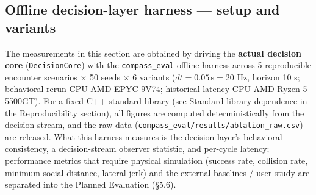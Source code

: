 \documentclass[11pt]{article}
\newcommand{\code}[1]{\texttt{#1}}
\begin{document}
\FloatBarrier
\subsection{Offline decision-layer harness --- setup and variants}

The measurements in this section are obtained by driving the \textbf{actual decision core} (\code{DecisionCore}) with the \code{compass\_eval} offline harness across 5 reproducible encounter scenarios $\times$ 50 seeds $\times$ 6 variants ($dt = 0.05\,\text{s} = 20$ Hz, horizon 10 s; behavioral rerun CPU AMD EPYC 9V74; historical latency CPU AMD Ryzen 5 5500GT). For a fixed C++ standard library (see Standard-library dependence in the Reproducibility section), all figures are computed deterministically from the decision stream, and the raw data (\code{compass\_eval/results/ablation\_raw.csv}) are released. What this harness measures is the decision layer's behavioral consistency, a decision-stream observer statistic, and per-cycle latency; performance metrics that require physical simulation (success rate, collision rate, minimum social distance, lateral jerk) and the external baselines / user study are separated into the Planned Evaluation (\S5.6).
\end{document}
